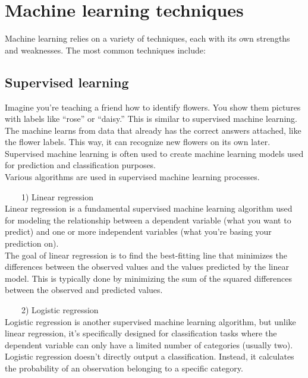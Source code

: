 \documentclass[
]{book}
\begin{document}
\hypertarget{machine-learning-techniques}{%
\section{Machine learning techniques}\label{machine-learning-techniques}}

Machine learning relies on a variety of techniques, each with its own strengths and weaknesses. The most common techniques include:

\hypertarget{supervised-learning}{%
\subsection*{Supervised learning}\label{supervised-learning}}

Imagine you're teaching a friend how to identify flowers. You show them pictures with labels like ``rose'' or ``daisy.'' This is similar to supervised machine learning. The machine learns from data that already has the correct answers attached, like the flower labels. This way, it can recognize new flowers on its own later.\\
Supervised machine learning is often used to create machine learning models used for prediction and classification purposes.\\
Various algorithms are used in supervised machine learning processes.

~~~~1) Linear regression\\
Linear regression is a fundamental supervised machine learning algorithm used for modeling the relationship between a dependent variable (what you want to predict) and one or more independent variables (what you're basing your prediction on).\\
The goal of linear regression is to find the best-fitting line that minimizes the differences between the observed values and the values predicted by the linear model. This is typically done by minimizing the sum of the squared differences between the observed and predicted values.

~~~~2) Logistic regression\\
Logistic regression is another supervised machine learning algorithm, but unlike linear regression, it's specifically designed for classification tasks where the dependent variable can only have a limited number of categories (usually two).\\
Logistic regression doesn't directly output a classification. Instead, it calculates the probability of an observation belonging to a specific category.
\end{document}
